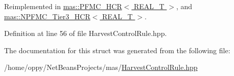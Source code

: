 Reimplemented in \hyperlink{structmas_1_1_p_f_m_c___h_c_r_a5571d69b3043c8a56b92e96a4f1837b5}{mas\-::\-P\-F\-M\-C\-\_\-\-H\-C\-R$<$ R\-E\-A\-L\-\_\-\-T $>$}, and \hyperlink{structmas_1_1_n_p_f_m_c___tier3___h_c_r_a1f7d15c97821f987d8b8ef1a2c8099a5}{mas\-::\-N\-P\-F\-M\-C\-\_\-\-Tier3\-\_\-\-H\-C\-R$<$ R\-E\-A\-L\-\_\-\-T $>$}.



Definition at line 56 of file Harvest\-Control\-Rule.\-hpp.



The documentation for this struct was generated from the following file\-:\begin{DoxyCompactItemize}
\item 
/home/oppy/\-Net\-Beans\-Projects/mas/\hyperlink{_harvest_control_rule_8hpp}{Harvest\-Control\-Rule.\-hpp}\end{DoxyCompactItemize}
